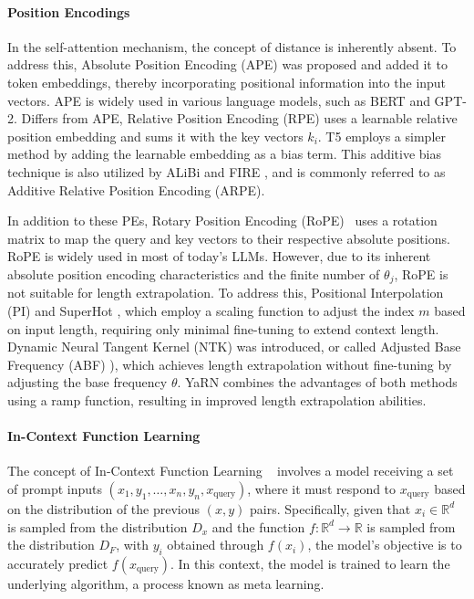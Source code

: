 \documentclass[letterpaper]{article} %
\begin{document}
\paragraph{Position Encodings}
In the self-attention mechanism, the concept of distance is inherently absent. To address this, Absolute Position Encoding (APE) \cite{vaswani-2017-attention} was proposed and added it to token embeddings, thereby incorporating positional information into the input vectors. APE is widely used in various language models, such as BERT \cite{devlin-2019-bert} and GPT-2. Differs from APE, Relative Position Encoding (RPE) \cite{shaw-2018-self} uses a learnable relative position embedding and sums it with the key vectors $k_i$. T5 \cite{raffel-2020-t5} employs a simpler method by adding the learnable embedding as a bias term. This additive bias technique is also utilized by ALiBi \cite{press-2022-train} and FIRE \cite{li-2024-functional}, and is commonly referred to as Additive Relative Position Encoding (ARPE).

In addition to these PEs, Rotary Position Encoding (RoPE)~\cite{su-2021-roformer} uses a rotation matrix to map the query and key vectors to their respective absolute positions. RoPE is widely used in most of today's LLMs. However, due to its inherent absolute position encoding characteristics and the finite number of $\theta_j$, RoPE is not suitable for length extrapolation. To address this, Positional Interpolation (PI) \cite{chen-2023-extending} and SuperHot \cite{kaiokendev-2023-superhot}, which employ a scaling function to adjust the index $m$ based on input length, requiring only minimal fine-tuning to extend context length. Dynamic Neural Tangent Kernel (NTK) \cite{bloc97-2023-ntk} was introduced, or called Adjusted Base Frequency (ABF) \cite{xiong-2024-effective}), which achieves length extrapolation without fine-tuning by adjusting the base frequency $\theta$. YaRN \cite{peng-2024-yarn} combines the advantages of both methods using a ramp function, resulting in improved length extrapolation abilities.

\paragraph{In-Context Function Learning}
The concept of In-Context Function Learning 
~\cite{garg-2022-what, bhattamishra-2024-understanding} involves a model receiving a set of prompt inputs $(x_1, y_1, \ldots, x_n, y_n, x_{\text{query}})$, where it must respond to $x_{\text{query}}$ based on the distribution of the previous $(x, y)$ pairs. Specifically, given that $x_i \in \mathbb{R}^d$ is sampled from the distribution $D_x$ and the function $f: \mathbb{R}^d \to \mathbb{R}$ is sampled from the distribution $D_F$, with $y_i$ obtained through $f(x_i)$, the model's objective is to accurately predict $f(x_{\text{query}})$. In this context, the model is trained to learn the underlying algorithm, a process known as meta learning.
\end{document}

